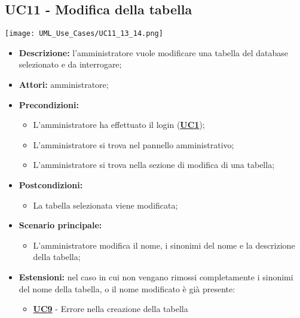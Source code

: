 \subsection{UC11 - Modifica della tabella}
\label{sec:UC11}
\texttt{[image: UML\_Use\_Cases/UC11\_13\_14.png]}
\begin{itemize}
	\item \textbf{Descrizione:} l’amministratore vuole modificare una tabella del database selezionato e da interrogare;
	\item \textbf{Attori:} amministratore;
	\item \textbf{Precondizioni:} 
	\begin{itemize}
		\item L’amministratore ha effettuato il login (\hyperref[sec:UC1]{\textbf{UC1}});
		\item L’amministratore si trova nel pannello amministrativo;
		\item L’amministratore si trova nella sezione di modifica di una tabella;
	\end{itemize}
	\item \textbf{Postcondizioni:} 
	\begin{itemize}
		\item La tabella selezionata viene modificata;
	\end{itemize}
	\item \textbf{Scenario principale:} 
	\begin{itemize}
		\item L’amministratore modifica il nome, i sinonimi del nome e la descrizione della tabella;
	\end{itemize}
	\item \textbf{Estensioni:} nel caso in cui non vengano rimossi completamente i sinonimi del nome della tabella, o il nome modificato è già presente:
	\begin{itemize}
		\item \hyperref[sec:UC9]{\textbf{UC9}} - Errore nella creazione della tabella
	\end{itemize}
\end{itemize}

